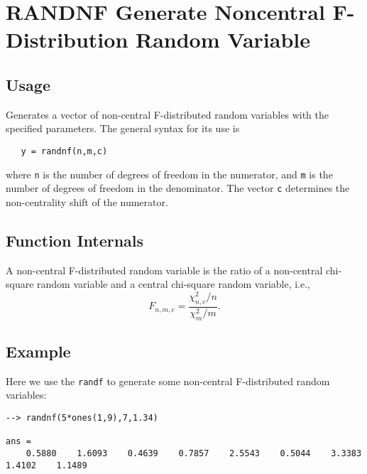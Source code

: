 \section{RANDNF Generate Noncentral F-Distribution Random Variable}

\subsection{Usage}

Generates a vector of non-central F-distributed random variables
with the specified parameters.  The general syntax for its use is
\begin{verbatim}
   y = randnf(n,m,c)
\end{verbatim}
where \verb|n| is the number of degrees of freedom in the numerator,
and \verb|m| is the number of degrees of freedom in the denominator.
The vector \verb|c| determines the non-centrality shift of the numerator.
\subsection{Function Internals}

A non-central F-distributed random variable is the ratio of a
non-central chi-square random variable and a central chi-square random
variable, i.e.,
\[
   F_{n,m,c} = \frac{\chi_{n,c}^2/n}{\chi_m^2/m}.
\]
\subsection{Example}

Here we use the \verb|randf| to generate some non-central F-distributed
random variables:
\begin{verbatim}
--> randnf(5*ones(1,9),7,1.34)

ans = 
    0.5880    1.6093    0.4639    0.7857    2.5543    0.5044    3.3383    1.4102    1.1489 
\end{verbatim}
